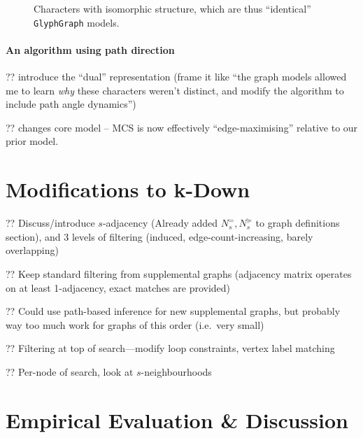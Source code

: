 \documentclass{mpaper}
\begin{document}
\begin{figure}
{
	}
	\caption{Characters with isomorphic structure, which are thus ``identical'' \texttt{GlyphGraph} models.\label{fig:badisomorphism}}
\end{figure}

\paragraph{An algorithm using path direction}
?? introduce the ``dual'' representation (frame it like ``the graph models allowed me to learn \emph{why} these characters weren't distinct, and modify the algorithm to include path angle dynamics'')

?? changes core model -- MCS is now effectively ``edge-maximising'' relative to our prior model.

\section{Modifications to k-Down}
\label{sec:k-down-mods}

?? Discuss/introduce $s$-adjacency (Already added $N^{=}_{s},N^{\succcurlyeq}_{s}$ to graph definitions section), and 3 levels of filtering (induced, edge-count-increasing, barely overlapping)

?? Keep standard filtering from supplemental graphs (adjacency matrix operates on at least 1-adjacency, exact matches are provided)

?? Could use path-based inference for new supplemental graphs, but probably way too much work for graphs of this order (i.e.\ very small)

?? Filtering at top of search---modify loop constraints, vertex label matching

?? Per-node of search, look at $s$-neighbourhoods

\section{Empirical Evaluation \& Discussion}
\label{sec:evaluation}
\end{document}
